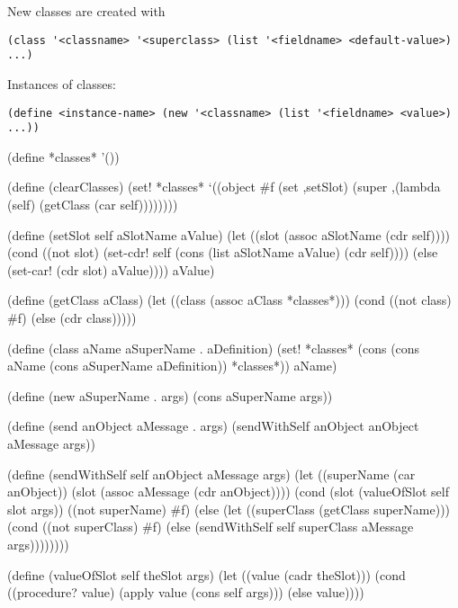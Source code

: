 \documentclass[a4paper,10pt]{article}
\theoremstyle{definition} \newtheorem{Def}{Definition}
\begin{document}
New classes are created with 
\begin{verbatim}
(class '<classname> '<superclass> (list '<fieldname> <default-value>) ...)
\end{verbatim}
Instances of classes:
\begin{verbatim}
(define <instance-name> (new '<classname> (list '<fieldname> <value>) ...))
\end{verbatim}

\nwenddocs{}\endmoddef

(define *classes* '())


 (define (clearClasses)
  (set! *classes* 
    `((object #f 
      (set ,setSlot)
      (super
         ,(lambda (self)
            (getClass (car self))))))))


 (define (setSlot self aSlotName aValue)
  (let ((slot (assoc aSlotName (cdr self))))
    (cond
      ((not slot) 
        (set-cdr! self 
          (cons 
            (list aSlotName  aValue) 
            (cdr self))))
      (else
        (set-car! (cdr slot) aValue))))
  aValue)


 (define (getClass aClass)
  (let ((class (assoc aClass *classes*)))
      (cond
        ((not class) #f)
        (else (cdr class)))))


 (define (class aName aSuperName . aDefinition)
  (set! *classes* 
    (cons 
      (cons aName (cons aSuperName aDefinition))
      *classes*))
  aName)


 (define (new aSuperName . args)
  (cons aSuperName args))


 (define (send anObject aMessage . args)
  (sendWithSelf anObject anObject aMessage args))


 (define (sendWithSelf self anObject aMessage args)
  (let 
    ((superName (car anObject))
     (slot (assoc aMessage (cdr anObject))))
    (cond
      (slot (valueOfSlot self slot args))
      ((not superName) #f)
      (else 
        (let ((superClass (getClass superName)))
          (cond
            ((not superClass) #f)
            (else
              (sendWithSelf self superClass aMessage args))))))))


 (define (valueOfSlot self theSlot args)
  (let ((value (cadr theSlot)))
    (cond
      ((procedure? value)
        (apply value (cons self args)))
      (else value))))


\nwendcode{}\nwdocspar
\end{document}
